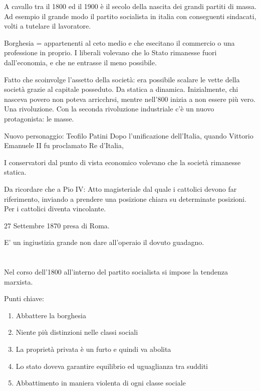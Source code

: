 \documentclass{article}
\begin{document}
    A cavallo tra il 1800 ed il 1900 è il secolo della nascita dei grandi partiti di massa. Ad esempio il grande modo il partito socialista in italia con conseguenti sindacati, volti a tutelare il lavoratore.

    Borghesia = appartenenti al ceto medio e che esecitano il commercio o una professione in proprio. I liberali volevano che lo Stato rimanesse fuori dall'economia, e che ne entrasse il meno possibile.

    Fatto che scoinvolge l'assetto della società: era possibile scalare le vette della società grazie al capitale posseduto. Da statica a dinamica. Inizialmente, chi nasceva povero non poteva arricchrsi, mentre nell'800 inizia a non essere più vero. Una rivoluzione.
    Con la seconda rivoluzione industriale c'è un nuovo protagonista: le masse.

    Nuovo personaggio: Teofilo Patini
    Dopo l'unificazione dell'Italia, quando Vittorio Emanuele II fu proclamato Re d'Italia, 

    I conservatori dal punto di vista economico volevano che la società rimanesse statica.

    Da ricordare che a Pio IV: Atto magisteriale dal quale i cattolici devono far riferimento, inviando a prendere una posizione chiara su determinate posizioni. Per i cattolici diventa vincolante.

    27 Settembre 1870 presa di Roma.

    E' un ingiustizia grande non dare all'operaio il dovuto guadagno.

    \section{}
    Nel corso dell'1800 all'interno del partito socialista si impose la tendenza marxista.

    Punti chiave:

    \begin{enumerate}
        \item Abbattere la borghesia
        \item Niente più distinzioni nelle classi sociali
        \item La proprietà privata è un furto e quindi va abolita
        \item Lo stato doveva garantire equilibrio ed uguaglianza tra sudditi
        \item Abbattimento in maniera violenta di ogni classe sociale
    \end{enumerate}
\end{document}
